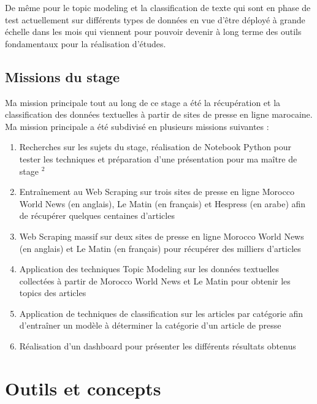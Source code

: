 \documentclass[a4paper,french,12pt]{article}
\begin{document}
De même pour le topic modeling et la classification de texte qui sont en phase de test actuellement sur différents types de données en vue d'être déployé à grande échelle dans les mois qui viennent pour pouvoir devenir à long terme des outils fondamentaux pour la réalisation d'études.

\subsection{Missions du stage}

Ma mission principale tout au long de ce stage a été la récupération et la classification des données textuelles à partir de sites de presse en ligne marocaine. Ma mission principale a été subdivisé en plusieurs missions suivantes :\\
\begin{enumerate}
    \item Recherches sur les sujets du stage, réalisation de Notebook Python pour tester les techniques et préparation d'une présentation pour ma maître de stage \href{https://drive.google.com/file/d/1n1O3t1en0OyxVw2emIDmp-ZYG5iQKkFv/view?usp=sharing}{$^2$}\\
    \item Entraînement au Web Scraping sur trois sites de presse en ligne Morocco World News (en anglais), Le Matin (en français) et Hespress (en arabe) afin de récupérer quelques centaines d'articles\\
    \item Web Scraping massif sur deux sites de presse en ligne Morocco World News (en anglais) et Le Matin (en français) pour récupérer des milliers d'articles\\
    \item Application des techniques Topic Modeling sur les données textuelles collectées à partir de Morocco World News et Le Matin pour obtenir les topics des articles\\
    \item Application de techniques de classification sur les articles par catégorie afin d'entraîner un modèle à déterminer la catégorie d'un article de presse\\
    \item Réalisation d'un dashboard pour présenter les différents résultats obtenus
\end{enumerate}

\section{Outils et concepts}
\label{sec:Outils et concepts}
\end{document}
